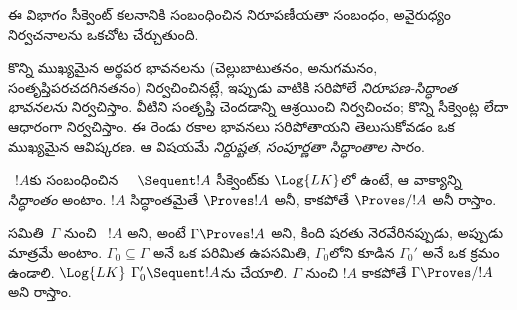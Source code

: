 \documentclass[../../../include/open-logic-section]{subfiles}
\begin{document}
\begin{editorial}
  ఈ విభాగం సీక్వెంట్ కలనానికి సంబంధించిన నిరూపణీయతా సంబంధం,
  అవైరుధ్యం నిర్వచనాలను ఒకచోట చేర్చుతుంది.
\end{editorial}

      {}
      {}


\begin{explain}
కొన్ని ముఖ్యమైన అర్థపర భావనలను (చెల్లుబాటుతనం, అనుగమనం,
సంతృప్తిపరచదగినతనం) నిర్వచించినట్లే, ఇప్పుడు వాటికి సరిపోలే
\emph{నిరూపణ-సిద్ధాంత భావనలను} నిర్వచిస్తాం. వీటిని 
 సంతృప్తి చెందడాన్ని ఆశ్రయించి నిర్వచించం; కొన్ని
సీక్వెంట్ల  లేదా  ఆధారంగా
నిర్వచిస్తాం. ఈ రెండు రకాల భావనలు సరిపోతాయని తెలుసుకోవడం ఒక ముఖ్యమైన
ఆవిష్కరణ. ఆ విషయమే \emph{నిర్దుష్టత},
\emph{సంపూర్ణతా సిద్ధాంతాల} సారం.
\end{explain}

\begin{defn}[సిద్ధాంతాలు]
~$!A$కు సంబంధించిన $\quad \Sequent !A$ సీక్వెంట్‌కు
$\Log{LK}$లో  ఉంటే, ఆ వాక్యాన్ని \emph{సిద్ధాంతం} అంటాం.
$!A$ సిద్ధాంతమైతే $\Proves !A$ అనీ, కాకపోతే $\Proves/ !A$ అనీ రాస్తాం.
\end{defn}

\begin{defn}
 సమితి~$\Gamma$ నుంచి ~$!A$
\emph{} అని, అంటే $\Gamma \Proves !A$ అని,
కింది షరతు నెరవేరినప్పుడు, అప్పుడు మాత్రమే అంటాం.
$\Gamma_0 \subseteq \Gamma$ అనే ఒక పరిమిత ఉపసమితి, $\Gamma_0$లోని
 కూడిన $\Gamma_0'$ అనే ఒక క్రమం ఉండాలి. $\Log{LK}$
$\Gamma_0' \Sequent !A$ను  చేయాలి. $\Gamma$ నుంచి $!A$
 కాకపోతే $\Gamma \Proves/ !A$ అని రాస్తాం.
\end{defn}
\end{document}
